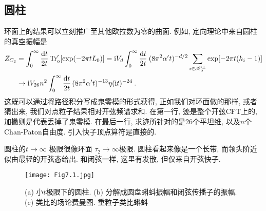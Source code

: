 \subsection*{圆柱}
环面上的结果可以立刻推广至其他欧拉数为零的曲面. 例如, 定向理论中来自圆柱的真空振幅是
\begin{align}
	Z_{C_{2}} &=\int_{0}^{\infty} \frac{\mathrm{d} t}{2 t} \operatorname{Tr}_{\mathrm{o}}^{\prime}[\exp(-2 \pi t L_{0})]
	=\mathrm{i} V_{d} \int_{0}^{\infty} \frac{\mathrm{d} t}{2 t}\: (8 \pi^{2} \alpha^{\prime} t)^{-d / 2} 
	\sum_{i \in \mathscr{H}_{0}^{\perp}} \exp[-2 \pi t(h_{i}-1)] \nonumber \\
	 &\rightarrow \mathrm{i} V_{26} n^{2} \int_{0}^{\infty} \frac{\mathrm{d} t}{2 t}\,(8 \pi^{2} \alpha^{\prime} t)^{-13} \eta(\mathrm{i} t)^{-24} \:. \label{7.4.1}
\end{align}
这既可以通过将路径积分写成鬼零模的形式获得, 正如我们对环面做的那样, 或者猜出来, 我们对点粒子结果相对开弦频谱求和. 
在第一行, 迹是整个开弦CFT上的, 加撇则是代表丢掉了鬼零模. 在最后一行, 求迹所针对的是26个平坦维, 以及$n$个Chan-Paton自由度. 引入快子顶点算符是直接的. 

圆柱的$t \rightarrow \infty$ 极限很像环面 $\tau_{2} \rightarrow \infty$极限. 圆柱看起来像是一个长带, 而领头阶近似由最轻的开弦态给出. 和闭弦一样, 这里有发散, 但仅来自开弦快子.

\begin{figure}[h]
	\begin{center}
		\texttt{[image: Fig7.1.jpg]}\\
		\caption{(a) 小$t$极限下的圆柱. (b) 分解成圆盘蝌蚪振幅和闭弦传播子的振幅. (c) 类比的场论费曼图. 重粒子类比蝌蚪}\label{Fig7.1}
	\end{center}
\end{figure}

